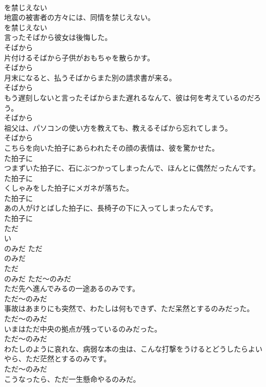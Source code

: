 \documentclass[8pt]{extreport}
\begin{document}
\begin{CJK}{UTF8}{min}
\\	を禁じえない
\\	地震の被害者の方々には、同情を禁じえない。	
\\	を禁じえない
\\	言ったそばから彼女は後悔した。	
\\	そばから
\\	片付けるそばから子供がおもちゃを散らかす。	
\\	そばから
\\	月末になると、払うそばからまた別の請求書が来る。	
\\	そばから
\\	もう遅刻しないと言ったそばからまた遅れるなんて、彼は何を考えているのだろう。	
\\	そばから
\\	祖父は、パソコンの使い方を教えても、教えるそばから忘れてしまう。	
\\	そばから
\\	こちらを向いた拍子にあらわれたその顔の表情は、彼を驚かせた。	
\\	た拍子に
\\	つまずいた拍子に、石にぶつかってしまったんで、ほんとに偶然だったんです。	
\\	た拍子に
\\	くしゃみをした拍子にメガネが落ちた。	
\\	た拍子に
\\	あの人がけとばした拍子に、長椅子の下に入ってしまったんです。	
\\	た拍子に
\\	ただ 
\\	い
\\	のみだ	ただ 
\\	のみだ	
\\	ただ 
\\	のみだ	ただ～のみだ
\\	ただ先へ進んでみるの一途あるのみです。	
\\	ただ～のみだ
\\	事故はあまりにも突然で、わたしは何もできず、ただ呆然とするのみだった。	
\\	ただ～のみだ
\\	いまはただ中央の拠点が残っているのみだった。	
\\	ただ～のみだ
\\	わたしのように哀れな、病弱な本の虫は、こんな打撃をうけるとどうしたらよいやら、ただ茫然とするのみです。	
\\	ただ～のみだ
\\	こうなったら、ただ一生懸命やるのみだ。	

\end{CJK}
\end{document}
